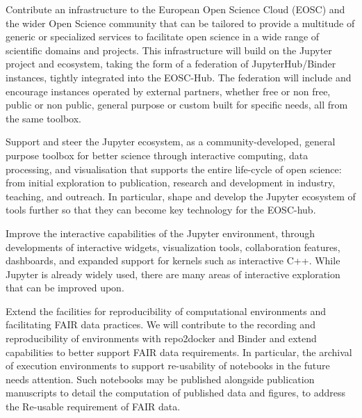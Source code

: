 \begin{compactenum}

\item \label{obj:deployment} %
  Contribute an infrastructure to the European Open Science Cloud
  (EOSC) and the wider Open Science community that can be tailored to
  provide a multitude of generic or specialized services to facilitate
  open science in a wide range of scientific domains and projects.
  This infrastructure will build on the Jupyter project and ecosystem,
  taking the form of a federation of JupyterHub/Binder instances,
  tightly integrated into the EOSC-Hub.
  The federation will include and encourage instances operated by
  external partners, whether free or non free, public or non public,
  general purpose or custom built for specific needs, all from the
  same toolbox.

\item \label{obj:jupyter} %
  Support and steer the Jupyter ecosystem, as a community-developed,
  general purpose
  toolbox for better science through interactive computing, data
  processing, and
  visualisation that supports the entire life-cycle of open science:
  from initial exploration to publication, research and development in
  industry, teaching, and outreach. In particular, shape and develop
  the Jupyter ecosystem of tools further so that they can become key
  technology for the EOSC-hub.

\item \label{obj:interactivity} %
  Improve the interactive capabilities of the Jupyter environment,
  through developments of interactive widgets,
  visualization tools, collaboration features, dashboards,
  and expanded support for kernels such as interactive C++.
  While Jupyter is already widely used, there are many areas
  of interactive exploration that can be improved upon.

\item \label{obj:reusability} %
  Extend the facilities for reproducibility of computational environments
  and facilitating FAIR data practices.
  We will contribute to the recording and reproducibility
  of environments with repo2docker and Binder
  and extend capabilities to better support FAIR
  data requirements. In particular, the archival of execution
  environments to support re-usability of notebooks in the future
  needs attention. Such notebooks may be published alongside
  publication manuscripts to detail the computation of published data
  and figures, to address the Re-usable requirement of FAIR data.


\end{compactenum}
